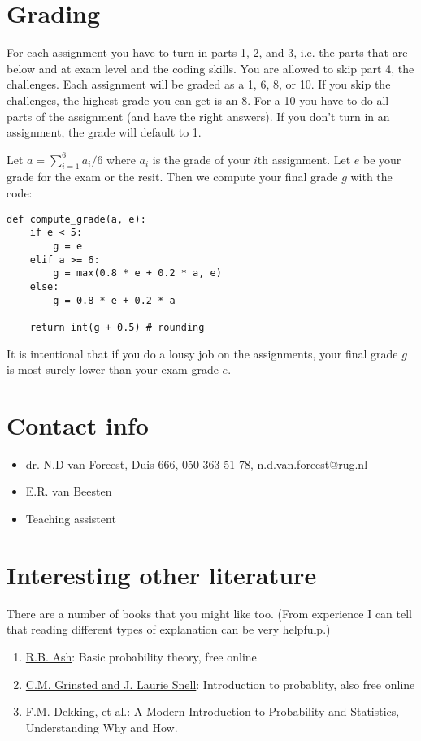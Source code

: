 \documentclass[a4paper]{article}
\theoremstyle{definition}
\newcommand{\1}[1]{\,I_{#1}} %
\begin{document}
\section{Grading}
\label{sec:org28d14dd}

For each assignment you  have to turn in  parts 1, 2, and 3, i.e. the parts  that are below and at exam level and the coding skills. You are allowed to skip part 4, the challenges. 
Each assignment will be graded as a 1, 6, 8, or 10.
If you skip the challenges, the highest grade you can get is an 8.
For a 10 you have to do all parts of the assignment (and have the right answers). 
If you don't turn in an assignment, the grade will default to 1.


Let \(a=\sum_{i=1}^6 a_{i}/6\) where \(a_i\) is the grade of your  \(i\)th assignment.
Let \(e\) be your grade for the exam or the resit.
Then we compute your final grade \(g\) with the code:
\begin{verbatim}
def compute_grade(a, e):
    if e < 5:
        g = e
    elif a >= 6:
        g = max(0.8 * e + 0.2 * a, e)
    else:
        g = 0.8 * e + 0.2 * a

    return int(g + 0.5) # rounding
\end{verbatim}
It is intentional that if you do a lousy job on the assignments, your final grade \(g\) is most surely lower than your exam grade \(e\).







\section{Contact info}
\label{sec:orgea25af6}

\begin{itemize}
\item dr. N.D van Foreest, Duis 666, 050-363 51 78, n.d.van.foreest@rug.nl
\item E.R. van Beesten
\item Teaching assistent
\end{itemize}



\section{Interesting other literature}
\label{sec:org69de6af}

There are a number of books that you might like too. (From experience I can tell that reading different types of explanation can be very helpfulp.)
\begin{enumerate}
\item \href{https://faculty.math.illinois.edu/\~r-ash/BPT.html}{R.B. Ash}: Basic probability theory, free online
\item \href{https://math.dartmouth.edu/\~prob/prob/prob.pdf}{C.M. Grinsted and J. Laurie Snell}: Introduction to probablity, also free online
\item F.M. Dekking, et al.: A Modern Introduction to Probability and Statistics, Understanding Why and How.
\end{enumerate}
\end{document}
